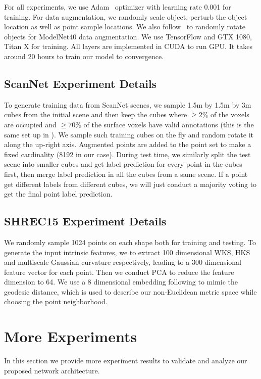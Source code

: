 For all experiments, we use Adam~\cite{adam} optimizer with learning rate 0.001 for training. For data augmentation, we randomly scale object, perturb the object location as well as point sample locations. We also follow~\cite{qi2016volumetric} to randomly rotate objects for ModelNet40 data augmentation. We use TensorFlow and GTX 1080, Titan X for training. All layers are implemented in CUDA to run GPU. It takes around 20 hours to train our model to convergence.

\subsection{ScanNet Experiment Details}
To generate training data from ScanNet scenes, we sample 1.5m by 1.5m by 3m cubes from the initial scene and then keep the cubes where $\ge 2\%$ of the voxels are occupied and $\ge 70\%$ of the surface voxels have valid annotations (this is the same set up in \cite{dai2017scannet}). We sample such training cubes on the fly and random rotate it along the up-right axis. Augmented points are added to the point set to make a fixed cardinality (8192 in our case). During test time, we similarly split the test scene into smaller cubes and get label prediction for every point in the cubes first, then merge label prediction in all the cubes from a same scene. If a point get different labels from different cubes, we will just conduct a majority voting to get the final point label prediction.

\subsection{SHREC15 Experiment Details}
We randomly sample 1024 points on each shape both for training and testing. To generate the input intrinsic features, we 
to extract 100 dimensional WKS, HKS and multiscale Gaussian curvature respectively, leading to a 300 dimensional feature vector for each point. Then we conduct PCA to reduce the feature dimension to 64. We use a 8 dimensional embedding following \cite{rustamov2009interior} to mimic the geodesic distance, which is used to describe our non-Euclidean metric space while choosing the point neighborhood.

\section{More Experiments}
\label{supp_exp}
In this section we provide more experiment results to validate and analyze our proposed network architecture. 

